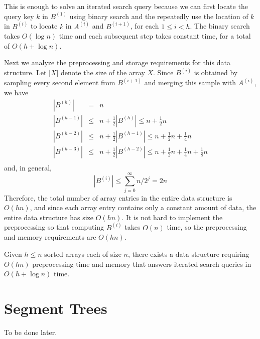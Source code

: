 This is enough to solve an iterated search query because we can first
locate the query key $k$ in $B^{(1)}$ using binary search and the
repeatedly use the location of $k$ in $B^{(i)}$ to locate $k$ in
$A^{(i)}$ and $B^{(i+1)}$, for each $1\le i< h$.  The binary search
takes $O(\log n)$ time and each subsequent step takes constant time,
for a total of $O(h+\log n)$.

Next we analyze the preprocessing and storage requirements for this
data structure.  Let $|X|$ denote the size of the array $X$.  Since
$B^{(i)}$ is obtained by sampling every second element from
$B^{(i+1)}$ and merging this sample with $A^{(i)}$, we have
\begin{eqnarray*}
|B^{(h)}| &=& n \\
|B^{(h-1)}| &\le & n + \frac{1}{2}|B^{(h)}| \le n + \frac{1}{2}n \\
|B^{(h-2)}| &\le & n + \frac{1}{2}|B^{(h-1)}| \le n + \frac{1}{2}n + \frac{1}{4}n \\
|B^{(h-3)}| &\le & n + \frac{1}{2}|B^{(h-2)}| \le n + \frac{1}{2}n + \frac{1}{4}n + \frac{1}{8}n \\
\end{eqnarray*}
and, in general, 
\[
|B^{(i)}|\le\sum_{j=0}^\infty n/2^j = 2n
\]
Therefore, the total number of array entries in the entire data
structure is $O(hn)$, and since each array entry contains only a
constant amount of data, the entire data structure has size $O(hn)$.
It is not hard to implement the preprocessing so that computing
$B^{(i)}$ takes $O(n)$ time, so the preprocessing and memory
requirements are $O(hn)$.

\begin{thm}
Given $h\le n$ sorted arrays each of size $n$, there exists a data
structure requiring $O(hn)$ preprocessing time and memory that answers
iterated search queries in $O(h+\log n)$ time.
\end{thm}

\section{Segment Trees}

To be done later.


